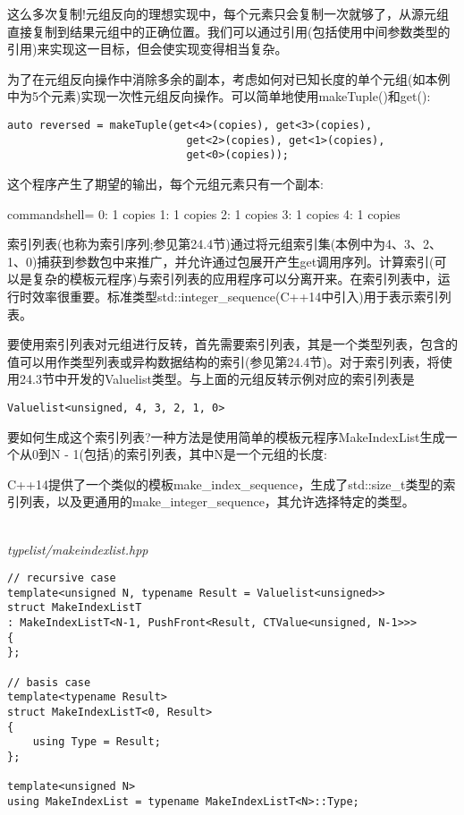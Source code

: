 这么多次复制!元组反向的理想实现中，每个元素只会复制一次就够了，从源元组直接复制到结果元组中的正确位置。我们可以通过引用(包括使用中间参数类型的引用)来实现这一目标，但会使实现变得相当复杂。

为了在元组反向操作中消除多余的副本，考虑如何对已知长度的单个元组(如本例中为5个元素)实现一次性元组反向操作。可以简单地使用makeTuple()和get():

\begin{lstlisting}[style=styleCXX]
auto reversed = makeTuple(get<4>(copies), get<3>(copies),
							get<2>(copies), get<1>(copies),
							get<0>(copies));
\end{lstlisting}

这个程序产生了期望的输出，每个元组元素只有一个副本:

\begin{tcblisting}{commandshell={}}
0: 1 copies
1: 1 copies
2: 1 copies
3: 1 copies
4: 1 copies
\end{tcblisting}

索引列表(也称为索引序列;参见第24.4节)通过将元组索引集(本例中为4、3、2、1、0)捕获到参数包中来推广，并允许通过包展开产生get调用序列。计算索引(可以是复杂的模板元程序)与索引列表的应用程序可以分离开来。在索引列表中，运行时效率很重要。标准类型std::integer\_sequence(C++14中引入)用于表示索引列表。


要使用索引列表对元组进行反转，首先需要索引列表，其是一个类型列表，包含的值可以用作类型列表或异构数据结构的索引(参见第24.4节)。对于索引列表，将使用24.3节中开发的Valuelist类型。与上面的元组反转示例对应的索引列表是

\begin{lstlisting}[style=styleCXX]
Valuelist<unsigned, 4, 3, 2, 1, 0>
\end{lstlisting}

要如何生成这个索引列表?一种方法是使用简单的模板元程序MakeIndexList生成一个从0到N - 1(包括)的索引列表，其中N是一个元组的长度:

\begin{tcolorbox}[colback=webgreen!5!white,colframe=webgreen!75!black]
\hspace*{0.75cm}C++14提供了一个类似的模板make\_index\_sequence，生成了std::size\_t类型的索引列表，以及更通用的make\_integer\_sequence，其允许选择特定的类型。
\end{tcolorbox}

\hspace*{\fill} \\ %
\noindent
\textit{typelist/makeindexlist.hpp}
\begin{lstlisting}[style=styleCXX]
// recursive case
template<unsigned N, typename Result = Valuelist<unsigned>>
struct MakeIndexListT
: MakeIndexListT<N-1, PushFront<Result, CTValue<unsigned, N-1>>>
{
};

// basis case
template<typename Result>
struct MakeIndexListT<0, Result>
{
	using Type = Result;
};

template<unsigned N>
using MakeIndexList = typename MakeIndexListT<N>::Type;
\end{lstlisting}

